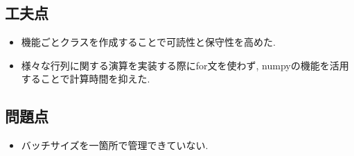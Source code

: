 \documentclass[a4j, titlepage]{jarticle}
\begin{document}
\subsection*{工夫点}
    \begin{itemize}
        \item 機能ごとクラスを作成することで可読性と保守性を高めた.
        \item 様々な行列に関する演算を実装する際にfor文を使わず, numpyの機能を活用することで計算時間を抑えた.
    \end{itemize}
\subsection*{問題点}
    \begin{itemize}
        \item バッチサイズを一箇所で管理できていない.
    \end{itemize}
\end{document}
